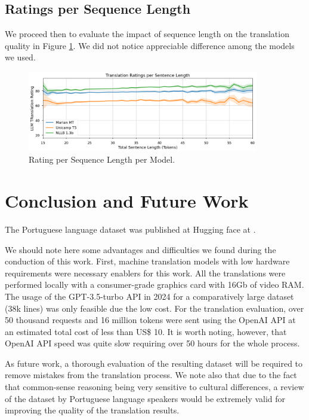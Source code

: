 \documentclass{article}
\begin{document}
\subsection{Ratings per Sequence Length}

We proceed then to evaluate the impact of sequence length on the translation
quality in Figure \ref{fig:line-chart}. We did not notice appreciable difference
among the models we used.

\begin{figure}[htpb]
    \centering
    \includegraphics[width=0.9\textwidth]{figures/line-chart.png}
    \caption{\label{fig:line-chart}Rating per Sequence Length per Model.}
\end{figure}

\section{Conclusion and Future Work}

The Portuguese language dataset was published at Hugging face at \cite{socialiqa_pt}. 

We should note here some advantages and difficulties we found during the
conduction of this work. First, machine translation models with low hardware
requirements were necessary enablers for this work. All the translations were
performed locally with a consumer-grade graphics card with 16Gb of video RAM.
The usage of the GPT-3.5-turbo API in 2024 for a comparatively large dataset
(38k lines) was only feasible due the low cost. For the translation evaluation,
over 50 thousand requests and 16 million tokens were sent using the OpenAI API
at an estimated total cost of less than US\$ 10. It is worth noting, however,
that OpenAI API speed was quite slow requiring over 50 hours for the whole
process.

As future work, a thorough evaluation of the resulting dataset will be required
to remove mistakes from the translation process. We note also that due to
the fact that common-sense reasoning being very sensitive to cultural
differences, a review of the dataset by Portuguese language speakers would be
extremely valid for improving the quality of the translation results.



\end{document}
